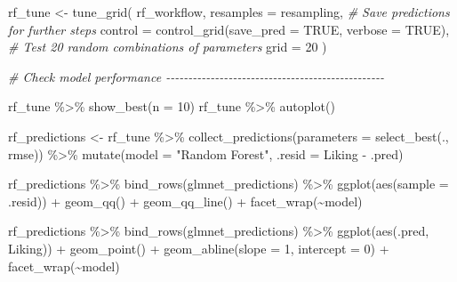 \documentclass[
]{book}
\newenvironment{Shaded}{\begin{snugshade}}{\end{snugshade}}
\newcommand{\AttributeTok}[1]{\textcolor[rgb]{0.77,0.63,0.00}{#1}}
\newcommand{\CommentTok}[1]{\textcolor[rgb]{0.56,0.35,0.01}{\textit{#1}}}
\newcommand{\ConstantTok}[1]{\textcolor[rgb]{0.00,0.00,0.00}{#1}}
\newcommand{\DecValTok}[1]{\textcolor[rgb]{0.00,0.00,0.81}{#1}}
\newcommand{\FunctionTok}[1]{\textcolor[rgb]{0.00,0.00,0.00}{#1}}
\newcommand{\NormalTok}[1]{#1}
\newcommand{\OtherTok}[1]{\textcolor[rgb]{0.56,0.35,0.01}{#1}}
\newcommand{\SpecialCharTok}[1]{\textcolor[rgb]{0.00,0.00,0.00}{#1}}
\newcommand{\StringTok}[1]{\textcolor[rgb]{0.31,0.60,0.02}{#1}}
\begin{document}
\begin{Shaded}
\begin{Highlighting}[]
\NormalTok{rf\_tune }\OtherTok{\textless{}{-}} 
  \FunctionTok{tune\_grid}\NormalTok{(}
\NormalTok{    rf\_workflow, }
    \AttributeTok{resamples =}\NormalTok{ resampling, }
    \CommentTok{\# Save predictions for further steps}
    \AttributeTok{control =} \FunctionTok{control\_grid}\NormalTok{(}\AttributeTok{save\_pred =} \ConstantTok{TRUE}\NormalTok{, }\AttributeTok{verbose =} \ConstantTok{TRUE}\NormalTok{),}
    \CommentTok{\# Test 20 random combinations of parameters}
    \AttributeTok{grid =} \DecValTok{20}
\NormalTok{  ) }

\CommentTok{\# Check model performance {-}{-}{-}{-}{-}{-}{-}{-}{-}{-}{-}{-}{-}{-}{-}{-}{-}{-}{-}{-}{-}{-}{-}{-}{-}{-}{-}{-}{-}{-}{-}{-}{-}{-}{-}{-}{-}{-}{-}{-}{-}{-}{-}{-}{-}{-}{-}{-}{-}}

\NormalTok{rf\_tune }\SpecialCharTok{\%\textgreater{}\%} \FunctionTok{show\_best}\NormalTok{(}\AttributeTok{n =} \DecValTok{10}\NormalTok{)}
\NormalTok{rf\_tune }\SpecialCharTok{\%\textgreater{}\%} \FunctionTok{autoplot}\NormalTok{()}

\NormalTok{rf\_predictions }\OtherTok{\textless{}{-}}\NormalTok{ rf\_tune }\SpecialCharTok{\%\textgreater{}\%}
  \FunctionTok{collect\_predictions}\NormalTok{(}\AttributeTok{parameters =} \FunctionTok{select\_best}\NormalTok{(., }\StringTok{\textquotesingle{}rmse\textquotesingle{}}\NormalTok{)) }\SpecialCharTok{\%\textgreater{}\%}
  \FunctionTok{mutate}\NormalTok{(}\AttributeTok{model =} \StringTok{"Random Forest"}\NormalTok{,}
         \AttributeTok{.resid =}\NormalTok{ Liking }\SpecialCharTok{{-}}\NormalTok{ .pred)}

\NormalTok{rf\_predictions }\SpecialCharTok{\%\textgreater{}\%}
  \FunctionTok{bind\_rows}\NormalTok{(glmnet\_predictions) }\SpecialCharTok{\%\textgreater{}\%}
  \FunctionTok{ggplot}\NormalTok{(}\FunctionTok{aes}\NormalTok{(}\AttributeTok{sample =}\NormalTok{ .resid)) }\SpecialCharTok{+}
  \FunctionTok{geom\_qq}\NormalTok{() }\SpecialCharTok{+}
  \FunctionTok{geom\_qq\_line}\NormalTok{() }\SpecialCharTok{+}
  \FunctionTok{facet\_wrap}\NormalTok{(}\SpecialCharTok{\textasciitilde{}}\NormalTok{model)}

\NormalTok{rf\_predictions }\SpecialCharTok{\%\textgreater{}\%}
  \FunctionTok{bind\_rows}\NormalTok{(glmnet\_predictions) }\SpecialCharTok{\%\textgreater{}\%}
  \FunctionTok{ggplot}\NormalTok{(}\FunctionTok{aes}\NormalTok{(.pred, Liking)) }\SpecialCharTok{+}
  \FunctionTok{geom\_point}\NormalTok{() }\SpecialCharTok{+}
  \FunctionTok{geom\_abline}\NormalTok{(}\AttributeTok{slope =} \DecValTok{1}\NormalTok{, }\AttributeTok{intercept =} \DecValTok{0}\NormalTok{) }\SpecialCharTok{+}
  \FunctionTok{facet\_wrap}\NormalTok{(}\SpecialCharTok{\textasciitilde{}}\NormalTok{model)}


\end{Highlighting}
\end{Shaded}
\end{document}
